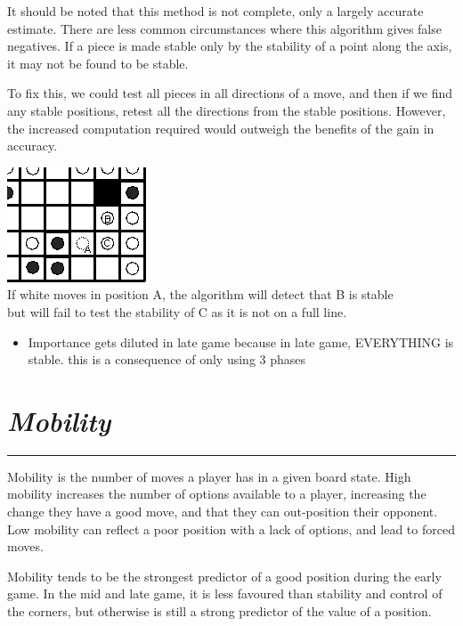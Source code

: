 \documentclass[10pt]{report}
\begin{document}
\begin{multicols}{2}
It should be noted that this method is not complete, only a largely accurate estimate. There are less common circumstances where this algorithm gives false negatives. If a piece is made stable only by the stability of a point along the axis, it may not be found to be stable.

To fix this, we could test all pieces in all directions of a move, and then if we find any stable positions, retest all the directions from the stable positions. However, the increased computation required would outweigh the benefits of the gain in accuracy.

\begin{center}
\includegraphics[scale=0.6]{falsepos.PNG}\\
If white moves in position A, the algorithm will detect that B is stable\\ but will fail to test the stability of C as it is not on a full line.
\end{center}

    \begin{itemize}
  \item
    Importance gets diluted in late game because in late game, EVERYTHING is stable. this is a consequence of only using 3 phases
  \end{itemize}

\section*{\emph{\textmd{Mobility}}}
\hrule

Mobility is the number of moves a player has in a given board state. High mobility increases the number of options available to a player, increasing the change they have a good move, and that they can out-position their opponent. Low mobility can reflect a poor position with a lack of options, and lead to forced moves.

Mobility tends to be the strongest predictor of a good position during the early game. In the mid and late game, it is less favoured than stability and control of the corners, but otherwise is still a strong predictor of the value of a position.


\end{multicols}
\end{document}
